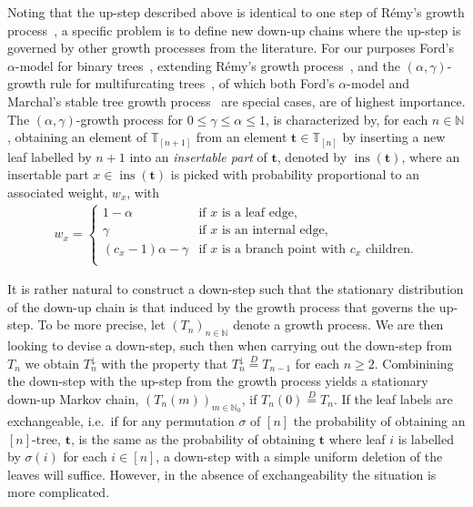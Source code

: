 \documentclass[a4paper, final]{amsart}
\theoremstyle{plain}
\theoremstyle{definition}
\newcommand{\tree}[1][t]{\boldsymbol{#1}}
\newcommand{\T}{\mathbb{T}}
\DeclareMathOperator{\insertable}{ins}
\newcommand{\insertablef}[1][\tree]{\insertable({\tree[#1]})}
\newcommand{\nin}{{n \in \mathbb{N}}}
\newcommand{\deq}{\stackrel{D}{=}}
\newcommand{\N}{\mathbb{N}}
\begin{document}
Noting that the up-step described above is identical to one step of R\'{e}my's growth process~\cite{RefWorks:doc:5b71b380e4b06c0731a629f4}, a specific problem is to define new down-up chains where the up-step is governed by other growth processes from the literature.
For our purposes Ford's $\alpha$-model for binary trees~\cite{RefWorks:doc:5b76ce32e4b0820c421f301d}, extending R\'{e}my's growth process~\cite{RefWorks:doc:5b71b380e4b06c0731a629f4}, and the $(\alpha, \gamma)$-growth rule for multifurcating trees~\cite{RefWorks:doc:5b4cbb5fe4b02dc0c79270af}, of which both Ford's $\alpha$-model and Marchal's stable tree growth process~\cite{RefWorks:doc:5b6c561fe4b06c0731a5c558} are special cases, are of highest importance.
The $(\alpha, \gamma)$-growth process for $0 \leq \gamma \leq \alpha \leq 1$, is characterized by, for each $\nin$, obtaining an element of $\T_{[n+1]}$ from an element $\tree \in \T_{[n]}$ by inserting a new leaf labelled by $n+1$ into an \textit{insertable part} of $\tree$, denoted by $\insertablef$, where an insertable part $x \in \insertablef$ is picked with probability proportional to an associated weight, $w_x$, with
%
\begin{align}
\label{eq:alphagamma_weights}
    w_x
    = 
    \begin{cases}
      1 - \alpha & \text{if $x$ is a leaf edge,} \\
      \gamma & \text{if $x$ is an internal edge,} \\
      \left( c_x - 1 \right) \alpha - \gamma & \text{if $x$ is a branch point with $c_x$ children.} \\
    \end{cases}
  \end{align}

It is rather natural to construct a down-step such that the stationary distribution of the down-up chain is that induced by the growth process that governs the up-step.
To be more precise, let ${\left( T_n \right)}_{\nin}$ denote a growth process.
We are then looking to devise a down-step, such then when carrying out the down-step from $T_n$ we obtain $T_n^\downarrow$ with the property that $T_n^\downarrow \deq T_{n-1}$ for each $n \geq 2$.
Combinining the down-step with the up-step from the growth process yields a stationary down-up Markov chain, ${\left( T_n(m) \right)}_{m \in \N_0}$, if $T_n(0) \deq T_n$.
If the leaf labels are exchangeable, i.e.\ if for any permutation $\sigma$ of $[n]$ the probability of obtaining an $[n]$-tree, $\tree$, is the same as the probability of obtaining $\tree$ where leaf $i$ is labelled by $\sigma(i)$ for each $i \in [n]$, a down-step with a simple uniform deletion of the leaves will suffice.
However, in the absence of exchangeability the situation is more complicated.
\end{document}
